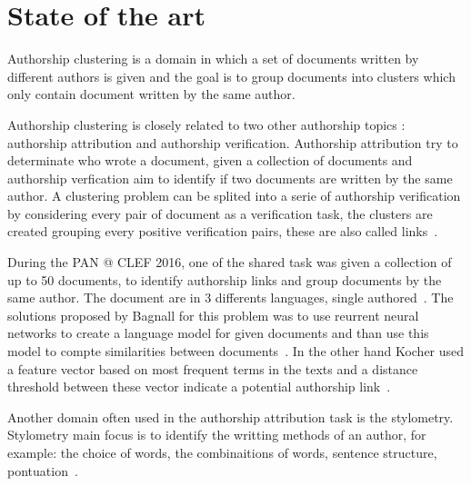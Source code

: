 \section{State of the art}

Authorship clustering is a domain in which a set of documents written by different authors is given and the goal is to group documents into clusters which only contain document written by the same author.

Authorship clustering is closely related to two other authorship topics : authorship attribution and authorship verification.
Authorship attribution try to determinate who wrote a document, given a collection of documents and authorship verfication aim to identify if two documents are written by the same author.
A clustering problem can be splited into a serie of authorship verification by considering every pair of document as a verification task, the clusters are created grouping every positive verification pairs, these are also called links~\cite{pan16_clustering_site}.

During the PAN @ CLEF 2016, one of the shared task was given a collection of up to 50 documents, to identify authorship links and group documents by the same author.
The document are in 3 differents languages, single authored~\cite{pan16}.
The solutions proposed by Bagnall for this problem was to use reurrent neural networks to create a language model for given documents and than use this model to compte similarities between documents~\cite{bagnall_pan16}.
In the other hand Kocher used a feature vector based on most frequent terms in the texts and a distance threshold between these vector indicate a potential authorship link~\cite{kocher_pan16}.

Another domain often used in the authorship attribution task is the stylometry.
Stylometry main focus is to identify the writting methods of an author, for example: the choice of words, the combinaitions of words, sentence structure, pontuation~\cite{savoy_stylo}.
